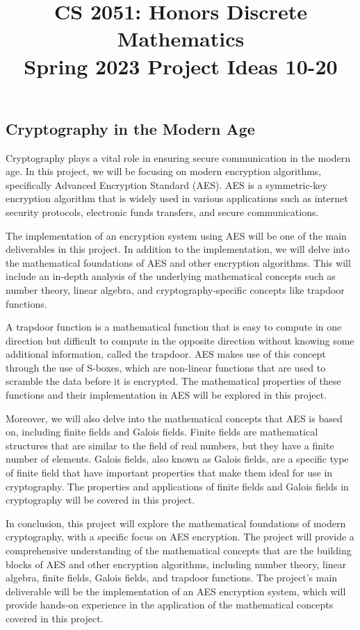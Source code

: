 \documentclass{article}
\title{\vspace{-1cm}CS 2051: Honors Discrete Mathematics \\Spring 2023 Project Ideas 10-20}
\author{}
\date{}
\begin{document}
\maketitle

\subsection*{Cryptography in the Modern Age}
    Cryptography plays a vital role in ensuring secure communication in the modern age. In this project, we will be focusing on modern encryption algorithms, specifically Advanced Encryption Standard (AES). AES is a symmetric-key encryption algorithm that is widely used in various applications such as internet security protocols, electronic funds transfers, and secure communications.
    
    \vspace{3mm}
    The implementation of an encryption system using AES will be one of the main deliverables in this project. In addition to the implementation, we will delve into the mathematical foundations of AES and other encryption algorithms. This will include an in-depth analysis of the underlying mathematical concepts such as number theory, linear algebra, and cryptography-specific concepts like trapdoor functions.
    
    \vspace{3mm}
    A trapdoor function is a mathematical function that is easy to compute in one direction but difficult to compute in the opposite direction without knowing some additional information, called the trapdoor. AES makes use of this concept through the use of S-boxes, which are non-linear functions that are used to scramble the data before it is encrypted. The mathematical properties of these functions and their implementation in AES will be explored in this project.
    
    \vspace{3mm}
    Moreover, we will also delve into the mathematical concepts that AES is based on, including finite fields and Galois fields. Finite fields are mathematical structures that are similar to the field of real numbers, but they have a finite number of elements. Galois fields, also known as Galois fields, are a specific type of finite field that have important properties that make them ideal for use in cryptography. The properties and applications of finite fields and Galois fields in cryptography will be covered in this project.
    
    \vspace{3mm}
    In conclusion, this project will explore the mathematical foundations of modern cryptography, with a specific focus on AES encryption. The project will provide a comprehensive understanding of the mathematical concepts that are the building blocks of AES and other encryption algorithms, including number theory, linear algebra, finite fields, Galois fields, and trapdoor functions. The project's main deliverable will be the implementation of an AES encryption system, which will provide hands-on experience in the application of the mathematical concepts covered in this project.
\end{document}
